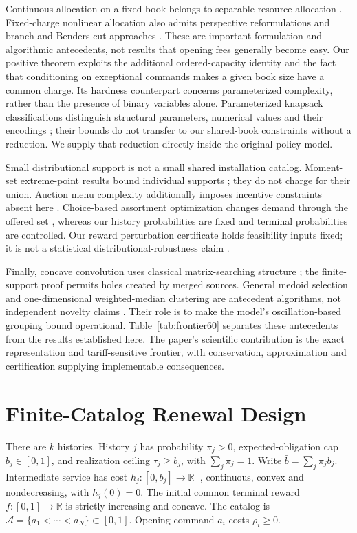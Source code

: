 \documentclass[11pt,letterpaper]{article}
\theoremstyle{definition}\newtheorem{remark}[theorem]{Remark}
\begin{document}
Continuous allocation on a fixed book belongs to separable resource allocation \citep{Patriksson2008}. Fixed-charge nonlinear allocation also admits perspective reformulations and branch-and-Benders-cut approaches \citep{Yang2025}. These are important formulation and algorithmic antecedents, not results that opening fees generally become easy. Our positive theorem exploits the additional ordered-capacity identity and the fact that conditioning on exceptional commands makes a given book size have a common charge. Its hardness counterpart concerns parameterized complexity, rather than the presence of binary variables alone. Parameterized knapsack classifications distinguish structural parameters, numerical values and their encodings \citep{Gurski2019}; their bounds do not transfer to our shared-book constraints without a reduction. We supply that reduction directly inside the original policy model.

Small distributional support is not a small shared installation catalog. Moment-set extreme-point results bound individual supports \citep{Winkler1988}; they do not charge for their union. Auction menu complexity additionally imposes incentive constraints absent here \citep{HartNisan2013,Babaioff2016}. Choice-based assortment optimization changes demand through the offered set \citep{Rusmevichientong2010}, whereas our history probabilities are fixed and terminal probabilities are controlled. Our reward perturbation certificate holds feasibility inputs fixed; it is not a statistical distributional-robustness claim \citep{EsfahaniKuhn2018}.

Finally, concave convolution uses classical matrix-searching structure \citep{Aggarwal1987}; the finite-support proof permits holes created by merged sources. General medoid selection and one-dimensional weighted-median clustering are antecedent algorithms, not independent novelty claims \citep{Arya2004,Wu1991}. Their role is to make the model's oscillation-based grouping bound operational. Table~\ref{tab:frontier60} separates these antecedents from the results established here. The paper's scientific contribution is the exact representation and tariff-sensitive frontier, with conservation, approximation and certification supplying implementable consequences.
\section{Finite-Catalog Renewal Design}\label{sec:model52}
There are $k$ histories. History $j$ has probability $\pi_j>0$, expected-obligation cap $b_j\in[0,1]$, and realization ceiling $\tau_j\geq b_j$, with $\sum_j\pi_j=1$. Write $\bar b=\sum_j\pi_jb_j$. Intermediate service has cost $h_j:[0,b_j]\to\mathbb R_+$, continuous, convex and nondecreasing, with $h_j(0)=0$. The initial common terminal reward $f:[0,1]\to\mathbb R$ is strictly increasing and concave. The catalog is $\mathcal A=\{a_1<\cdots<a_N\}\subset[0,1]$. Opening command $a_i$ costs $\rho_i\geq0$.
\end{document}
